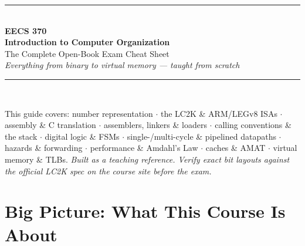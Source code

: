 \documentclass[10pt]{article}
\begin{document}
\begin{titlepage}
\centering
\vspace*{1.2cm}
{\color{umblue}\rule{\textwidth}{4pt}}\\[0.5cm]
{\Huge\bfseries\color{umblue} EECS 370}\\[0.3cm]
{\LARGE\bfseries\color{accent} Introduction to Computer Organization}\\[0.5cm]
{\Large The Complete Open-Book Exam Cheat Sheet}\\[0.3cm]
{\large\itshape Everything from binary to virtual memory --- taught from scratch}\\[0.4cm]
{\color{maize}\rule{\textwidth}{4pt}}\\[1cm]


\vfill
{\large This guide covers: number representation $\cdot$ the LC2K \& ARM/LEGv8 ISAs $\cdot$
assembly \& C translation $\cdot$ assemblers, linkers \& loaders $\cdot$ calling conventions \&
the stack $\cdot$ digital logic \& FSMs $\cdot$ single-/multi-cycle \& pipelined datapaths $\cdot$
hazards \& forwarding $\cdot$ performance \& Amdahl's Law $\cdot$ caches \& AMAT $\cdot$ virtual memory \& TLBs.}
\vfill
{\small\itshape Built as a teaching reference. Verify exact bit layouts against the official
LC2K spec on the course site before the exam.}
\end{titlepage}

\tableofcontents
\newpage

\section{Big Picture: What This Course Is About}
\end{document}
